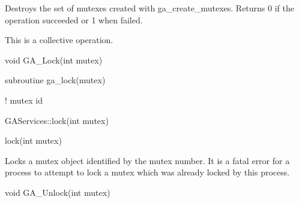 \documentclass[12pt]{article}
\begin{document}
\begin{desc}

Destroys the set of mutexes created with ga_create_mutexes. Returns 0 if 
the operation succeeded or 1 when failed.

This is a collective operation.
\end{desc}


\begin{capi}
\begin{ccode}
void GA_Lock(int mutex)
\end{ccode}
\begin{funcargs}
\end{funcargs}
\end{capi}

\begin{fapi}
\begin{fcode}
subroutine ga_lock(mutex)
\end{fcode}
\begin{funcargs}
\end{funcargs}
   ! mutex id
\end{fapi}

\begin{cxxapi}
\begin{cxxcode}
GAServices::lock(int mutex)
\end{cxxcode}
\begin{funcargs}
\end{funcargs}
\end{cxxapi}

\begin{pyapi}
\begin{pycode}
lock(int mutex)  
\end{pycode}
\end{pyapi}


\begin{desc}

Locks a mutex object identified by the mutex number. It is a fatal 
error for a process to attempt to lock a mutex which was already 
locked by this process.
\end{desc}


\begin{capi}
\begin{ccode}
void GA_Unlock(int mutex)
\end{ccode}
\begin{funcargs}
\end{funcargs}
\end{capi}
\end{document}
